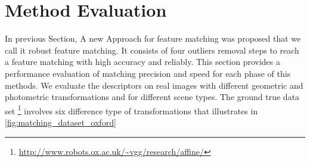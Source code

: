\section {Method Evaluation}
In previous Section, A new Approach for feature matching was proposed that we call it robust feature matching. It consists of four outliers removal steps to reach a feature matching with high accuracy and reliably. This section provides a performance evaluation of matching precision and speed for each phase of this methods. We evaluate the descriptors on real images with different geometric and photometric transformations and for different scene types. The ground true data set \footnote {\url{http://www.robots.ox.ac.uk/~vgg/research/affine/}} involves six difference type of transformations that illustrates in \autoref{fig:matching_dataset_oxford}


